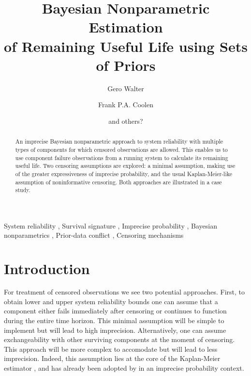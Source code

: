 \documentclass[12pt, a4paper]{elsarticle}
\begin{document}
\begin{frontmatter}
\title{Bayesian Nonparametric Estimation\\ of Remaining Useful Life using Sets of Priors}

\author[ein]{Gero Walter}
\author[dur]{Frank P.A. Coolen}
\author{and others?}

\address[ein]{School of Industrial Engineering, Eindhoven University of Technology, Eindhoven, NL}
\address[dur]{Department of Mathematical Sciences, Durham University, Durham, UK}

\begin{abstract}
An imprecise Bayesian nonparametric approach
to system reliability with multiple types of components
for which censored observations are allowed.
This enables us to use component failure observations from a running system
to calculate its remaining useful life.
Two censoring assumptions are explored:
a minimal assumption, making use of the greater expressiveness of imprecise probability,
and the usual Kaplan-Meier-like assumption of noninformative censoring.
Both approaches are illustrated in a case study.
\end{abstract}

\begin{keyword}
System reliability \sep
Survival signature \sep
Imprecise probability \sep
Bayesian nonparametrics \sep
Prior-data conflict \sep
Censoring mechanisms
\end{keyword}
\end{frontmatter}



\section{Introduction}

For treatment of censored observations
we see two potential approaches.
First, to obtain lower and upper system reliability bounds 
one can assume that a component either fails immediately after censoring or
continues to function during the entire time horizon.
This minimal assumption will be simple to implement but will lead to high imprecision.
Alternatively, one can assume exchangeability with other surviving components at the moment of censoring.
This approach will be more complex to accomodate but will lead to less imprecision.
Indeed, this assumption lies at the core of the Kaplan-Meier estimator \citep{1958:kaplan-meier},
and has already been adopted by \citet{2004:coolen-yan} in an imprecise probability context.\\
\end{document}
